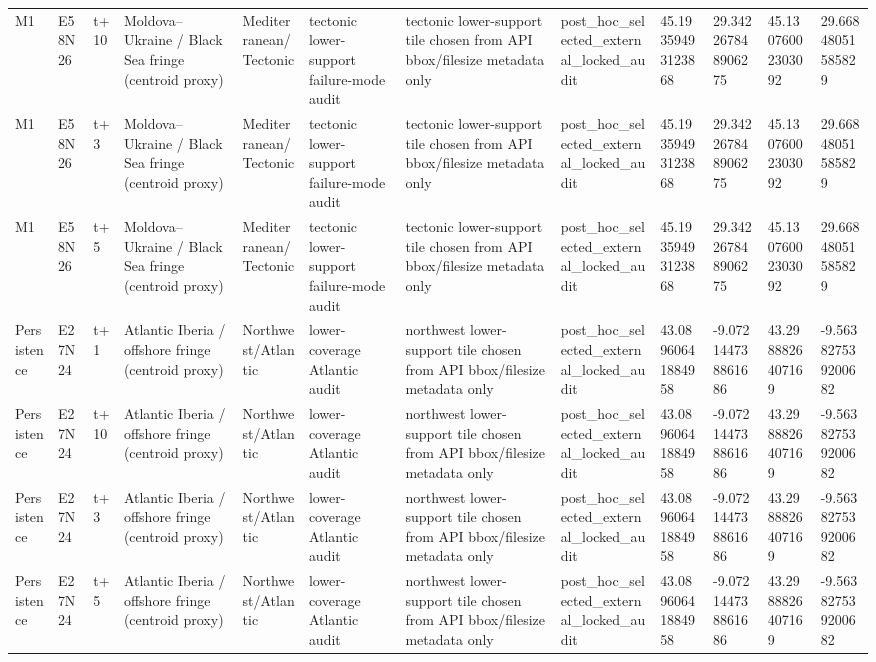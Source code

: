 \begin{landscape}
\begin{longtable}{llllllllllll}
M1 & E58N26 & t+10 & Moldova–Ukraine / Black Sea fringe (centroid proxy) & Mediterranean/Tectonic & tectonic lower-support failure-mode audit & tectonic lower-support tile chosen from API bbox/filesize metadata only & post\_hoc\_selected\_external\_locked\_audit & 45.19359493123868 & 29.342267848906275 & 45.13076002303092 & 29.66848051585829 \\
M1 & E58N26 & t+3 & Moldova–Ukraine / Black Sea fringe (centroid proxy) & Mediterranean/Tectonic & tectonic lower-support failure-mode audit & tectonic lower-support tile chosen from API bbox/filesize metadata only & post\_hoc\_selected\_external\_locked\_audit & 45.19359493123868 & 29.342267848906275 & 45.13076002303092 & 29.66848051585829 \\
M1 & E58N26 & t+5 & Moldova–Ukraine / Black Sea fringe (centroid proxy) & Mediterranean/Tectonic & tectonic lower-support failure-mode audit & tectonic lower-support tile chosen from API bbox/filesize metadata only & post\_hoc\_selected\_external\_locked\_audit & 45.19359493123868 & 29.342267848906275 & 45.13076002303092 & 29.66848051585829 \\
Persistence & E27N24 & t+1 & Atlantic Iberia / offshore fringe (centroid proxy) & Northwest/Atlantic & lower-coverage Atlantic audit & northwest lower-support tile chosen from API bbox/filesize metadata only & post\_hoc\_selected\_external\_locked\_audit & 43.08960641884958 & -9.072144738861686 & 43.2988826407169 & -9.563827539200682 \\
Persistence & E27N24 & t+10 & Atlantic Iberia / offshore fringe (centroid proxy) & Northwest/Atlantic & lower-coverage Atlantic audit & northwest lower-support tile chosen from API bbox/filesize metadata only & post\_hoc\_selected\_external\_locked\_audit & 43.08960641884958 & -9.072144738861686 & 43.2988826407169 & -9.563827539200682 \\
Persistence & E27N24 & t+3 & Atlantic Iberia / offshore fringe (centroid proxy) & Northwest/Atlantic & lower-coverage Atlantic audit & northwest lower-support tile chosen from API bbox/filesize metadata only & post\_hoc\_selected\_external\_locked\_audit & 43.08960641884958 & -9.072144738861686 & 43.2988826407169 & -9.563827539200682 \\
Persistence & E27N24 & t+5 & Atlantic Iberia / offshore fringe (centroid proxy) & Northwest/Atlantic & lower-coverage Atlantic audit & northwest lower-support tile chosen from API bbox/filesize metadata only & post\_hoc\_selected\_external\_locked\_audit & 43.08960641884958 & -9.072144738861686 & 43.2988826407169 & -9.563827539200682 \\

\end{longtable}
\end{landscape}
